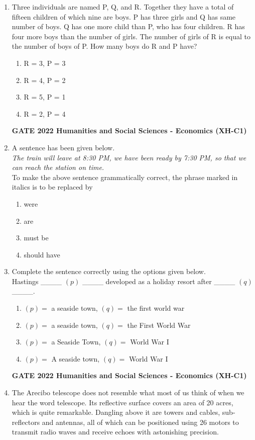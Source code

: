 \documentclass[journal,12pt,onecolumn]{exam}
\theoremstyle{remark}
\begin{document}
\begin{enumerate}
    \item Three individuals are named P, Q, and R. Together they have a total of fifteen children of which nine are boys. P has three girls and Q has same number of boys. Q has one more child than P, who has four children. R has four more boys than the number of girls. The number of girls of R is equal to the number of boys of P. How many boys do R and P have?

    \begin{enumerate}
        \item R = 3, P = 3
        \item R = 4, P = 2
        \item R = 5, P = 1
        \item R = 2, P = 4
    \end{enumerate}
    \textbf{GATE 2022 Humanities and Social Sciences - Economics (XH-C1)}
 \item A sentence has been given below.\\

    \textit{The train will leave at 8:30 PM, we have been ready by 7:30 PM, so that we can reach the station on time.}\\

    To make the above sentence grammatically correct, the phrase marked in italics is to be replaced by

    \begin{enumerate}
        \item were
        \item are
        \item must be
        \item should have
    \end{enumerate}
    \newpage
    \item Complete the sentence correctly using the options given below.\\

    Hastings \_\_\_\_ $(p)$ \_\_\_\_ developed as a holiday resort after \_\_\_\_ $(q)$ \_\_\_\_.\\

    \begin{enumerate}
        \item $(p) =$ a seaside town, \quad $(q) =$ the first world war
        \item $(p) =$ a seaside town, \quad $(q) =$ the First World War
        \item $(p) =$ a Seaside Town, \quad $(q) =$ World War I
        \item $(p) =$ A seaside town, \quad $(q) =$ World War I
    \end{enumerate}
\textbf{GATE 2022 Humanities and Social Sciences - Economics (XH-C1)}
\item The Arecibo telescope does not resemble what most of us think of when we hear
the word telescope. Its reflective surface covers an area of 20 acres, which is quite
remarkable. Dangling above it are towers and cables, sub-reflectors and antennas,
all of which can be positioned using 26 motors to transmit radio waves and receive
echoes with astonishing precision.


\end{enumerate}
\end{document}

